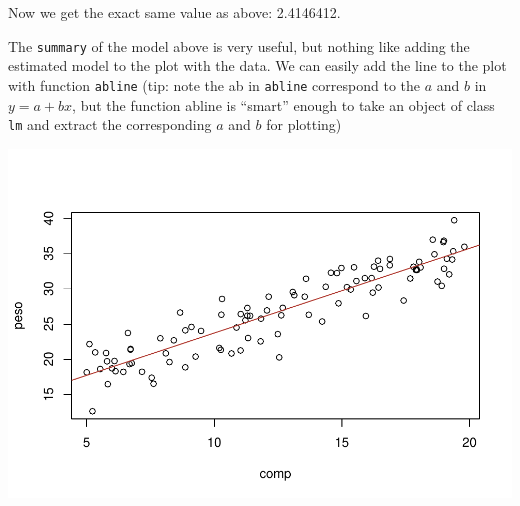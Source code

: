 \documentclass[
]{book}
\newenvironment{Shaded}{\begin{snugshade}}{\end{snugshade}}
\newcommand{\CommentTok}[1]{\textcolor[rgb]{0.56,0.35,0.01}{\textit{#1}}}
\newcommand{\DataTypeTok}[1]{\textcolor[rgb]{0.13,0.29,0.53}{#1}}
\newcommand{\DecValTok}[1]{\textcolor[rgb]{0.00,0.00,0.81}{#1}}
\newcommand{\FloatTok}[1]{\textcolor[rgb]{0.00,0.00,0.81}{#1}}
\newcommand{\KeywordTok}[1]{\textcolor[rgb]{0.13,0.29,0.53}{\textbf{#1}}}
\newcommand{\NormalTok}[1]{#1}
\newcommand{\OperatorTok}[1]{\textcolor[rgb]{0.81,0.36,0.00}{\textbf{#1}}}
\newcommand{\StringTok}[1]{\textcolor[rgb]{0.31,0.60,0.02}{#1}}
\begin{document}
Now we get the exact same value as above: 2.4146412.

The \texttt{summary} of the model above is very useful, but nothing like adding the estimated model to the plot with the data. We can easily add the line to the plot with function \texttt{abline} (tip: note the ab in \texttt{abline} correspond to the \(a\) and \(b\) in \(y=a+bx\), but the function abline is ``smart'' enough to take an object of class \texttt{lm} and extract the corresponding \(a\) and \(b\) for plotting)

\begin{Shaded}
\end{Shaded}

\includegraphics{ECOMODbook_files/figure-latex/a6.9-1.pdf}
\end{document}
